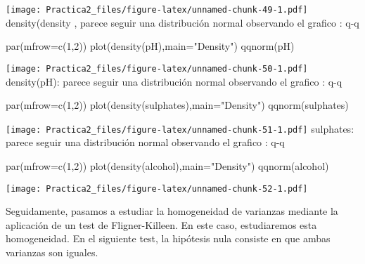 \documentclass[
]{article}
\newenvironment{Shaded}{\begin{snugshade}}{\end{snugshade}}
\newcommand{\AttributeTok}[1]{\textcolor[rgb]{0.77,0.63,0.00}{#1}}
\newcommand{\DecValTok}[1]{\textcolor[rgb]{0.00,0.00,0.81}{#1}}
\newcommand{\FunctionTok}[1]{\textcolor[rgb]{0.00,0.00,0.00}{#1}}
\newcommand{\NormalTok}[1]{#1}
\newcommand{\StringTok}[1]{\textcolor[rgb]{0.31,0.60,0.02}{#1}}
\begin{document}
\texttt{[image: Practica2\_files/figure-latex/unnamed-chunk-49-1.pdf]}
density(density , parece seguir una distribución normal observando el
grafico : q-q

\begin{Shaded}
\begin{Highlighting}[]
\FunctionTok{par}\NormalTok{(}\AttributeTok{mfrow=}\FunctionTok{c}\NormalTok{(}\DecValTok{1}\NormalTok{,}\DecValTok{2}\NormalTok{))}
\FunctionTok{plot}\NormalTok{(}\FunctionTok{density}\NormalTok{(pH),}\AttributeTok{main=}\StringTok{"Density"}\NormalTok{)}
\FunctionTok{qqnorm}\NormalTok{(pH)}
\end{Highlighting}
\end{Shaded}

\texttt{[image: Practica2\_files/figure-latex/unnamed-chunk-50-1.pdf]}
density(pH): parece seguir una distribución normal observando el grafico
: q-q

\begin{Shaded}
\begin{Highlighting}[]
\FunctionTok{par}\NormalTok{(}\AttributeTok{mfrow=}\FunctionTok{c}\NormalTok{(}\DecValTok{1}\NormalTok{,}\DecValTok{2}\NormalTok{))}
\FunctionTok{plot}\NormalTok{(}\FunctionTok{density}\NormalTok{(sulphates),}\AttributeTok{main=}\StringTok{"Density"}\NormalTok{)}
\FunctionTok{qqnorm}\NormalTok{(sulphates)}
\end{Highlighting}
\end{Shaded}

\texttt{[image: Practica2\_files/figure-latex/unnamed-chunk-51-1.pdf]}
sulphates: parece seguir una distribución normal observando el grafico :
q-q

\begin{Shaded}
\begin{Highlighting}[]
\FunctionTok{par}\NormalTok{(}\AttributeTok{mfrow=}\FunctionTok{c}\NormalTok{(}\DecValTok{1}\NormalTok{,}\DecValTok{2}\NormalTok{))}
\FunctionTok{plot}\NormalTok{(}\FunctionTok{density}\NormalTok{(alcohol),}\AttributeTok{main=}\StringTok{"Density"}\NormalTok{)}
\FunctionTok{qqnorm}\NormalTok{(alcohol)}
\end{Highlighting}
\end{Shaded}

\texttt{[image: Practica2\_files/figure-latex/unnamed-chunk-52-1.pdf]}

Seguidamente, pasamos a estudiar la homogeneidad de varianzas mediante
la aplicación de un test de Fligner-Killeen. En este caso, estudiaremos
esta homogeneidad. En el siguiente test, la hipótesis nula consiste en
que ambas varianzas son iguales.
\end{document}
